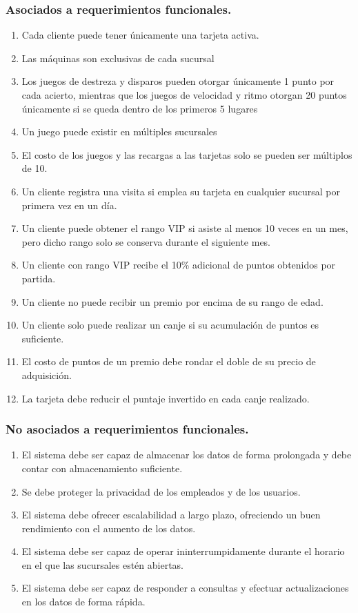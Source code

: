 \subsubsection*{Asociados a requerimientos funcionales.}

\begin{enumerate}
    \item Cada cliente puede tener únicamente una tarjeta activa.
    \item Las máquinas son exclusivas de cada sucursal
    \item Los juegos de destreza y disparos pueden otorgar únicamente 1 punto por cada acierto, mientras que los juegos de velocidad y ritmo otorgan 20 puntos únicamente si se queda dentro de los primeros 5 lugares
    \item Un juego puede existir en múltiples sucursales
    \item El costo de los juegos y las recargas a las tarjetas solo se pueden ser múltiplos de 10.
    \item Un cliente registra una visita si emplea su tarjeta en cualquier sucursal por primera vez en un día.
\item Un cliente puede obtener el rango VIP si asiste al menos 10 veces en un mes, pero dicho rango solo se conserva durante el siguiente mes.
\item Un cliente con rango VIP recibe el 10\% adicional de puntos obtenidos por partida.
\item Un cliente no puede recibir un premio por encima de su rango de edad.
\item Un cliente solo puede realizar un canje si su acumulación de puntos es suficiente.
\item El costo de puntos de un premio debe rondar el doble de su precio de adquisición.
\item La tarjeta debe reducir el puntaje invertido en cada canje realizado.
\end{enumerate}

\subsubsection*{No asociados a requerimientos funcionales.}

\begin{enumerate}
    \item El sistema debe ser capaz de almacenar los datos de forma prolongada y debe contar con almacenamiento suficiente.
    \item Se debe proteger la privacidad de los empleados y de los usuarios.
    \item El sistema debe ofrecer escalabilidad a largo plazo, ofreciendo un buen rendimiento con el aumento de los datos.
    \item El sistema debe ser capaz de operar ininterrumpidamente durante el horario en el que las sucursales estén abiertas.
    \item El sistema debe ser capaz de responder a consultas y efectuar actualizaciones en los datos de forma rápida.
\end{enumerate}

